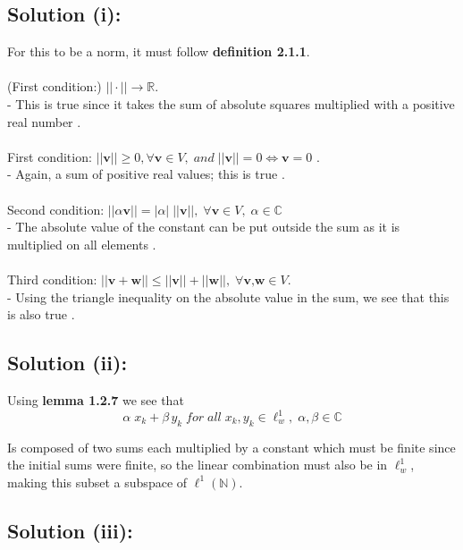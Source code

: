 \documentclass{article}
\begin{document}
\subsection*{Solution (i):}

For this to be a norm, it must follow \textbf{definition 2.1.1}.
\\
\\
(First condition:) $|| \cdot ||  \rightarrow \mathbb{R}$. \\
- This is true since it takes the sum of absolute squares multiplied with a positive real number \checkmark.\\
\\
First condition: $||\textbf{v}|| \geq 0, \forall\textbf{v} \in V,\; and \; ||\textbf{v}||=0 \Leftrightarrow \textbf{v}=0$ .\\
- Again, a sum of positive real values; this is true \checkmark.\\
\\
Second condition: $||\alpha \textbf{v}|| = |\alpha| \; ||\textbf{v}||, \; \forall \textbf{v} \in V, \; \alpha \in \mathbb{C}$\\
- The absolute value of the constant can be put outside the sum as it is multiplied on all elements \checkmark.\\
\\
Third condition: $|| \textbf{v}+\textbf{w}|| \leq ||\textbf{v}|| +|| \textbf{w}||,\; \forall \textbf{v,w} \in V$.\\
- Using the triangle inequality on the absolute value in the sum, we see that this is also true \checkmark. 
\subsection*{Solution (ii):}
Using \textbf{lemma 1.2.7} we see that
\begin{equation*}
    \alpha \; x_k + \beta \, y_k \; for \; all \; x_k, y_k \in \ell_w^1, \; \alpha, \beta \in \mathbb{C} 
\end{equation*}

Is composed of two sums each multiplied by a constant which must be finite since the initial sums were finite, so the linear combination must also be in $\ell_w^1$, making this subset a subspace of $\ell^1(\mathbb{N})$. 

\subsection*{Solution (iii):}
\end{document}
